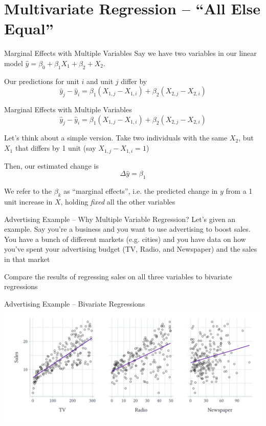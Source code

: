 \documentclass[aspectratio=169,t,11pt,table]{beamer}
\begin{document}
\section{Multivariate Regression -- ``All Else Equal''}

\begin{frame}{Marginal Effects with Multiple Variables}
  Say we have two variables in our linear model $\hat{y} = \beta_0 + \beta_1 X_1 + \beta_2 + X_2$.

  \bigskip
  Our predictions for unit $i$ and unit $j$ differ by
  $$
    \hat{y}_j - \hat{y}_i = \beta_1 (X_{1,j} - X_{1,i}) + \beta_2 (X_{2,j} - X_{2,i})
  $$
\end{frame}
  
\begin{frame}{Marginal Effects with Multiple Variables}
  \vspace*{-\bigskipamount}
  $$
    \hat{y}_j - \hat{y}_i = \beta_1 (X_{1,j} - X_{1,i}) + \beta_2 (X_{2,j} - X_{2,i})
  $$
  
  \bigskip
  Let's think about a simple version. 
  Take two individuals with the same $X_2$, but $X_1$ that differs by 1 unit (say $X_{1,j} - X_{1,i} = 1$)

  \pause
  \bigskip
  Then, our estimated change is 
  $$
    \Delta \hat{y} = \beta_1
  $$
  
  We refer to the $\beta_k$ as ``marginal effects'', i.e. the predicted change in $y$ from a 1 unit increase in $X$, holding \emph{fixed} all the other variables
\end{frame}

\begin{frame}{Advertising Example -- Why Multiple Variable Regression?}
  Let's given an example. Say you're a business and you want to use advertising to boost sales. You have a bunch of different markets (e.g. cities) and you have data on how you've spent your advertising budget (TV, Radio, and Newspaper) and the sales in that market

  \bigskip
  Compare the results of regressing sales on all three variables to bivariate regressions  
\end{frame}

\begin{frame}{Advertising Example -- Bivariate Regressions}
  \includegraphics[width=\textwidth]{figures/sales_bivariate.pdf}
\end{frame}
\end{document}
